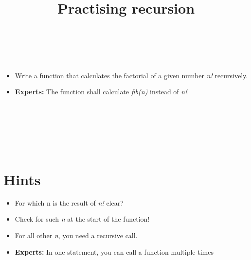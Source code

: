 


\title{Practising recursion} %
\author{} %
\renewcommand{\difficulty}{Hard} %
\renewcommand{\requirements}{Functions, recursion} %
\renewcommand{\aims}{Functions} %


 \maketitle
 \taskinfos

\ \\\ \\
\begin{itemize}
	\item Write a function that calculates the factorial of a given number \textit{n!} recursively.
	\item \textbf{Experts:} The function shall calculate \textit{fib(n)} instead of \textit{n!}.
\end{itemize}	
 
 
\ \\\ \\\ \\\ \\\ \\
\section*{Hints}
	\begin{itemize}
		\item For which n is the result of \textit{n!} clear?
		\item Check for such \textit{n} at the start of the function!
		\item For all other \textit{n}, you need a recursive call.
		\item \textbf{Experts:} In one statement, you can call a function multiple times
	\end{itemize}
 

